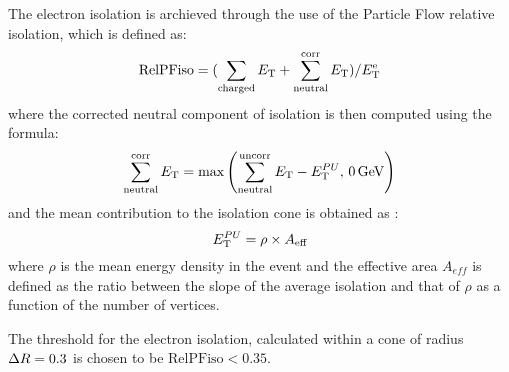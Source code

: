 The electron isolation is archieved through the use of the Particle Flow relative isolation,
which is defined as:
\begin{equation}
\text{RelPFiso} = (\sum_{\text{charged}} E_{\mathrm{T}} + \sum^{\text{corr}}_{\text{neutral}} E_{\mathrm{T}})/E_{\mathrm{T}}^{\text{e}}
\label{eqn:elepfrelisoeqn}
\end{equation} 
where the corrected neutral component of isolation is then computed using the formula:
\begin{equation}
\label{eqn:neutralea}
  \sum^{\text{corr}}_{\text{neutral}} E_{\mathrm{T}} = \text{max} \left( \sum^{\text{uncorr}}_{\text{neutral}} E_{\mathrm{T}} - E_{\mathrm{T}}^{PU},\, 0 \,\text{Ge\hspace{-.08em}V} \right)
\end{equation}
and the mean \pileup{} contribution to the isolation cone is obtained as :
\begin{equation}
  E_{\mathrm{T}}^{PU} =  \rho \times A_\text{eff}
\label{eqn:purho}
\end{equation}
where $\rho$ is the mean energy density in the event and the effective area $A_{eff}$ is defined as the ratio
between the slope of the average isolation and that of $\rho$ as a function of the number of vertices.

The threshold for the electron isolation,
calculated within a cone of radius $\Delta R = 0.3$
is chosen to be $\text{RelPFiso} < 0.35$. 
